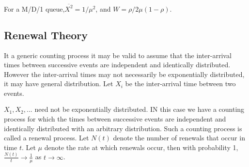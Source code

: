 For a M/D/1 queue,$\overline{X^{2}} = 1/\mu^{2}$, and $W = \rho/ 2\mu(1-\rho)$.

\subsection{Renewal Theory}

It  a generic counting process it may be valid to assume that  the inter-arrival times between successive events are independent and identically distributed. However the inter-arrival times may not necessarily be exponentially distributed, it may have general distribution. 
Let $X_i$ be the inter-arrival time between two events.

$X_1,X_2,...$ need not be exponentially distributed. IN this case we have a counting process for which the times between successive events are independent and identically distributed with an arbitrary distribution. Such a counting process is called a renewal process. 
Let $N(t)$ denote the number of renewals that occur in time $t$. Let $\mu$ denote the rate at which renewals occur, then
with probability 1, $\frac{N(t)}{t} \to \frac{1}{\mu}$ as $t \to \infty$.

